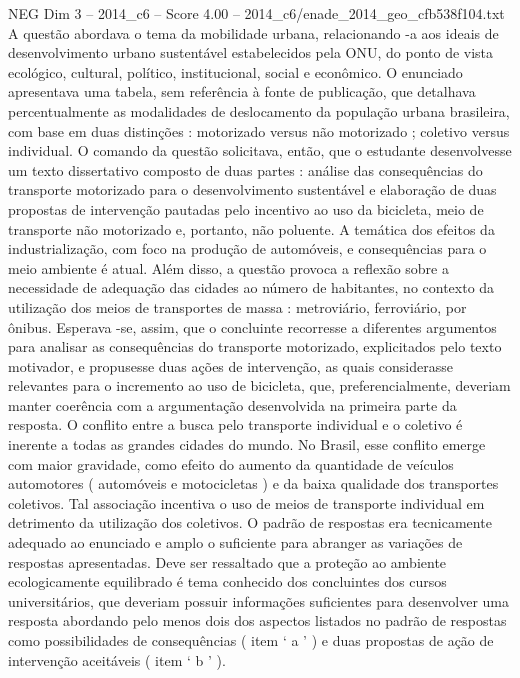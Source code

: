 \begin{textsample}{NEG Dim 3 – 2014\_c6 – Score 4.00 – 2014\_c6/enade\_2014\_geo\_cfb538f104.txt}
A questão abordava o tema da mobilidade urbana, relacionando -a aos ideais de desenvolvimento urbano sustentável estabelecidos pela ONU, do ponto de vista ecológico, cultural, político, institucional, social e econômico.
O enunciado apresentava uma tabela, sem referência à fonte de publicação, que detalhava percentualmente as modalidades de deslocamento da população urbana brasileira, com base em duas distinções : motorizado versus não motorizado ; coletivo versus individual.
O comando da questão solicitava, então, que o estudante desenvolvesse um texto dissertativo composto de duas partes : análise das consequências do transporte motorizado para o desenvolvimento sustentável e elaboração de duas propostas de intervenção pautadas pelo incentivo ao uso da bicicleta, meio de transporte não motorizado e, portanto, não poluente.
A temática dos efeitos da industrialização, com foco na produção de automóveis, e consequências para o meio ambiente é atual.
Além disso, a questão provoca a reflexão sobre a necessidade de adequação das cidades ao número de habitantes, no contexto da utilização dos meios de transportes de massa : metroviário, ferroviário, por ônibus.
Esperava -se, assim, que o concluinte recorresse a diferentes argumentos para analisar as consequências do transporte motorizado, explicitados pelo texto motivador, e propusesse duas ações de intervenção, as quais considerasse relevantes para o incremento ao uso de bicicleta, que, preferencialmente, deveriam manter coerência com a argumentação desenvolvida na primeira parte da resposta.
O conflito entre a busca pelo transporte individual e o coletivo é inerente a todas as grandes cidades do mundo.
No Brasil, esse conflito emerge com maior gravidade, como efeito do aumento da quantidade de veículos automotores ( automóveis e motocicletas ) e da baixa qualidade dos transportes coletivos.
Tal associação incentiva o uso de meios de transporte individual em detrimento da utilização dos coletivos.
O padrão de respostas era tecnicamente adequado ao enunciado e amplo o suficiente para abranger as variações de respostas apresentadas.
Deve ser ressaltado que a proteção ao ambiente ecologicamente equilibrado é tema conhecido dos concluintes dos cursos universitários, que deveriam possuir informações suficientes para desenvolver uma resposta abordando pelo menos dois dos aspectos listados no padrão de respostas como possibilidades de consequências ( item ‘ a ’ ) e duas propostas de ação de intervenção aceitáveis ( item ‘ b ’ ).

\end{textsample}
